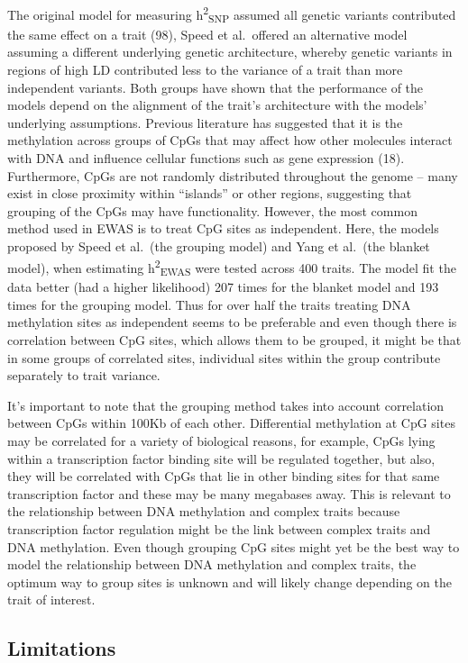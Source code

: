 \documentclass[11pt,oneside]{bristolthesis}
\begin{document}
The original model for measuring h\textsuperscript{2}\textsubscript{SNP} assumed all genetic variants contributed the same effect on a trait (98), Speed et al.~offered an alternative model assuming a different underlying genetic architecture, whereby genetic variants in regions of high LD contributed less to the variance of a trait than more independent variants. Both groups have shown that the performance of the models depend on the alignment of the trait's architecture with the models' underlying assumptions. Previous literature has suggested that it is the methylation across groups of CpGs that may affect how other molecules interact with DNA and influence cellular functions such as gene expression (18). Furthermore, CpGs are not randomly distributed throughout the genome -- many exist in close proximity within ``islands'' or other regions, suggesting that grouping of the CpGs may have functionality. However, the most common method used in EWAS is to treat CpG sites as independent. Here, the models proposed by Speed et al.~(the grouping model) and Yang et al.~(the blanket model), when estimating h\textsuperscript{2}\textsubscript{EWAS} were tested across 400 traits. The model fit the data better (had a higher likelihood) 207 times for the blanket model and 193 times for the grouping model. Thus for over half the traits treating DNA methylation sites as independent seems to be preferable and even though there is correlation between CpG sites, which allows them to be grouped, it might be that in some groups of correlated sites, individual sites within the group contribute separately to trait variance.

It's important to note that the grouping method takes into account correlation between CpGs within 100Kb of each other. Differential methylation at CpG sites may be correlated for a variety of biological reasons, for example, CpGs lying within a transcription factor binding site will be regulated together, but also, they will be correlated with CpGs that lie in other binding sites for that same transcription factor and these may be many megabases away. This is relevant to the relationship between DNA methylation and complex traits because transcription factor regulation might be the link between complex traits and DNA methylation. Even though grouping CpG sites might yet be the best way to model the relationship between DNA methylation and complex traits, the optimum way to group sites is unknown and will likely change depending on the trait of interest.

\hypertarget{limitations-05}{%
\subsection{Limitations}\label{limitations-05}}
\end{document}
